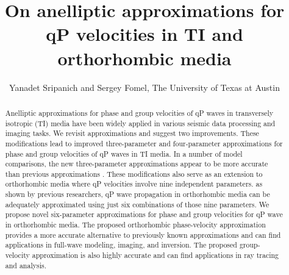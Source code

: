 \title{On anelliptic approximations for qP velocities in TI and orthorhombic media}
\author{Yanadet Sripanich and Sergey Fomel, The University of Texas at Austin}

\address{
Bureau of Economic Geology \\
John A. and Katherine G. Jackson School of Geosciences \\
The University of Texas at Austin \\
University Station, Box X \\
Austin, TX 78713-8924 
}
\maketitle


\begin{abstract}
Anelliptic approximations for phase and group velocities of qP waves in transversely isotropic (TI) media have been widely applied in various seismic data processing and imaging tasks. 
We revisit   approximations and suggest two improvements. 
 These modifications lead to improved three-parameter and four-parameter approximations for phase and group velocities of qP waves in TI media. In a number of model comparisons, the new three-parameter approximations appear to be more accurate than  previous approximations .
These modifications also serve as   an extension to orthorhombic media where qP velocities involve nine independent  parameters.  as shown by previous researchers, qP wave propagation in orthorhombic media can be adequately approximated using just six combinations of those nine parameters. 
We propose novel six-parameter approximations for phase and group velocities for qP wave in orthorhombic media.
The proposed orthorhombic phase-velocity approximation provides a more accurate alternative to previously known approximations and can find applications in full-wave modeling, imaging, and inversion. 
The proposed group-velocity approximation is also highly accurate and can find applications in ray tracing and  analysis.
\end{abstract}


